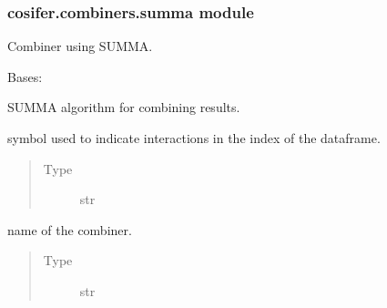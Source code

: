\documentclass[letterpaper,10pt,english]{sphinxmanual}
\begin{document}
\subsubsection{cosifer.combiners.summa module}
\label{\detokenize{_modules/cosifer.combiners:module-cosifer.combiners.summa}}\label{\detokenize{_modules/cosifer.combiners:cosifer-combiners-summa-module}}
Combiner using SUMMA.

\begin{fulllineitems}
\label{\detokenize{_modules/cosifer.combiners:cosifer.combiners.summa.Summa}}
Bases: {\hyperref[\detokenize{_modules/cosifer.combiners:cosifer.combiners.network_combiner.NetworkCombiner}]{}}

SUMMA algorithm for combining results.

\begin{fulllineitems}
\label{\detokenize{_modules/cosifer.combiners:cosifer.combiners.summa.Summa.interaction_symbol}}
symbol used to indicate
interactions in the index of the dataframe.
\begin{quote}\begin{description}
\item[{Type}] \leavevmode
str

\end{description}\end{quote}

\end{fulllineitems}


\begin{fulllineitems}
\label{\detokenize{_modules/cosifer.combiners:cosifer.combiners.summa.Summa.name}}
name of the combiner.
\begin{quote}\begin{description}
\item[{Type}] \leavevmode
str


\end{description}
\end{quote}
\end{fulllineitems}
\end{fulllineitems}
\end{document}
